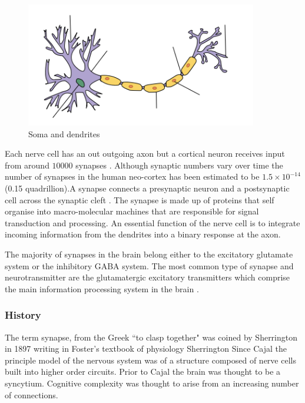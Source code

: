 \begin{figure}
    \centering
    \includegraphics[width=0.9\textwidth]{images/Neuron-no_labels2.png}
    \caption{Soma and dendrites}
    \label{fig:soma and dendrites}
\end{figure}

Each nerve cell has an out outgoing axon but a cortical neuron receives input from around $10000$ synapses \cite{laughlin2003communication}.
Although synaptic numbers vary over time the number of synapses in the human neo-cortex has been estimated to be $1.5 \times 10^{-14}$ (0.15 quadrillion).\cite{pakkenberg2003aging}A synapse connects a presynaptic neuron and a postsynaptic cell across the synaptic cleft \cite{sudhof2012presynaptic}. The synapse is made up of proteins that self organise into macro-molecular machines that are responsible for signal transduction and processing.\cite{frank2016nmda}  An essential function of the nerve cell is to integrate incoming information from the dendrites into a binary response at the axon.\cite{lassek2015synaptic} \cite{pocklington2006proteomes}

 The majority of synapses in the brain belong either to the excitatory glutamate system or the inhibitory GABA system. The most common type of synapse and neurotransmitter are the glutamatergic excitatory transmitters which comprise the main information processing system in the brain \cite{stewart2014structure} .

\subsubsection{History}
The term synapse, from the Greek ``to clasp together" was coined by Sherrington in 1897 writing in Foster’s textbook of physiology   Sherrington \cite{foster1895text} Since Cajal the principle model of the nervous system was of a structure composed of nerve cells built into higher order circuits. Prior to Cajal the brain was thought to be a syncytium. Cognitive complexity was thought to arise from an increasing number of connections. 

